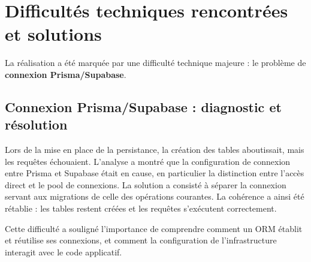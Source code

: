 \section{Difficultés techniques rencontrées et solutions}

La réalisation a été marquée par une difficulté technique majeure : le problème de \textbf{connexion Prisma/Supabase}.

\subsection{Connexion Prisma/Supabase : diagnostic et résolution}

Lors de la mise en place de la persistance, la création des tables aboutissait, mais les requêtes échouaient. L'analyse a montré que la configuration de connexion entre Prisma et Supabase était en cause, en particulier la distinction entre l'accès direct et le pool de connexions. La solution a consisté à séparer la connexion servant aux migrations de celle des opérations courantes. La cohérence a ainsi été rétablie : les tables restent créées et les requêtes s'exécutent correctement.

Cette difficulté a souligné l'importance de comprendre comment un \acf{ORM} établit et réutilise ses connexions, et comment la configuration de l'infrastructure interagit avec le code applicatif.
